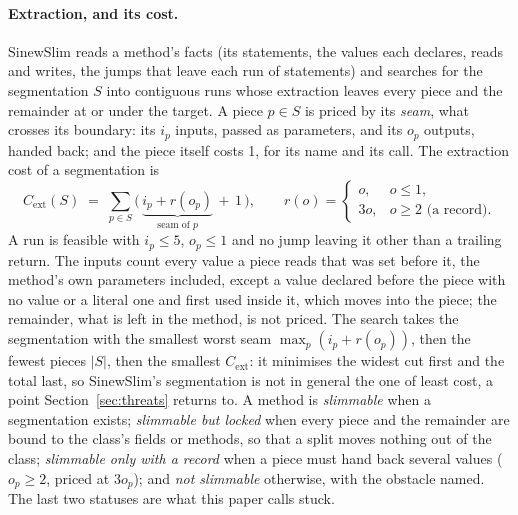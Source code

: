 \documentclass[11pt,a4paper]{article}
\begin{document}
\paragraph{Extraction, and its cost.} SinewSlim reads a method's facts (its
statements, the values each declares, reads and writes, the jumps that leave
each run of statements) and searches for the segmentation $S$ into contiguous
runs whose extraction leaves every piece and the remainder at or under the
target. A piece $p \in S$ is priced by its \emph{seam}, what crosses its
boundary: its $i_p$ inputs, passed as parameters, and its $o_p$ outputs,
handed back; and the piece itself costs 1, for its name and its call. The
extraction cost of a segmentation is
\begin{equation}\label{eq:extraction}
  C_{\mathrm{ext}}(S) \;=\; \sum_{p \in S}
    \bigl(\, \underbrace{i_p + r(o_p)}_{\text{seam of } p} \,+\, 1 \,\bigr),
  \qquad
  r(o) = \begin{cases} o, & o \le 1,\\ 3o, & o \ge 2 \text{ (a record)}. \end{cases}
\end{equation}
A run is feasible with $i_p \le 5$, $o_p \le 1$ and no jump leaving it other
than a trailing return. The inputs count every value a piece reads that was
set before it, the method's own parameters included, except a value declared
before the piece with no value or a literal one and first used inside it,
which moves into the piece; the remainder, what is left in the method, is
not priced. The search takes the segmentation with the
smallest worst seam $\max_{p} (i_p + r(o_p))$, then the fewest pieces $|S|$,
then the smallest $C_{\mathrm{ext}}$: it minimises the widest cut first and
the total last, so SinewSlim's segmentation is not in general the one of
least cost, a point Section~\ref{sec:threats} returns to. A method is
\emph{slimmable} when a segmentation exists; \emph{slimmable but locked} when
every piece and the remainder are bound to the class's fields or methods, so
that a split moves nothing out of the class; \emph{slimmable only with a
record} when a piece must hand back several values ($o_p \ge 2$, priced at
$3o_p$); and \emph{not slimmable} otherwise, with the obstacle named. The
last two statuses are what this paper calls stuck.
\end{document}
